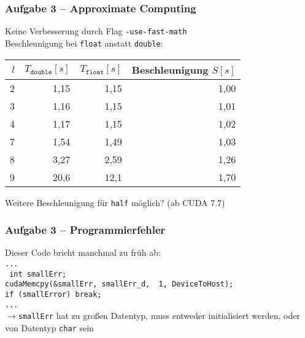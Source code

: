 \documentclass[german,notes,18pt]{beamer}
\begin{document}
	\begin{frame}
		\frametitle{Aufgabe 3 -- Approximate Computing}
		Keine Verbesserung durch Flag \texttt{-use-fast-math} \\
		\vspace{2em}
		Beschleunigung bei \texttt{float} anstatt \texttt{double}:
		\begin{center}
			\begin{tabular}{r|r|r|r}
				$l$ & $T_\mathtt{double}[s]$ & $T_\mathtt{float}[s]$ & Beschleunigung $S[s]$ \\
				\hline
				2 & 1,15 & 1,15 & 1,00 \\
				3 & 1,16 & 1,15 & 1,01 \\
				4 & 1,17 & 1,15 & 1,02 \\
				7 & 1,54 & 1,49 & 1,03 \\
				8 & 3,27 & 2,59 & 1,26 \\
				9 & 20,6 & 12,1 & 1,70
			\end{tabular}
		\end{center}
		\vspace{2em}
		Weitere Beschleunigung für \texttt{half} möglich? (ab CUDA 7.7)
	\end{frame}
	\begin{frame}
		\frametitle{Aufgabe 3 -- Programmierfehler}
		Dieser Code bricht manchmal zu früh ab: \\
		\vspace{1em}
		\texttt{... \\
			{ int} smallErr; \\
			cudaMemcpy(\&smallErr, smallErr\_d, { 1}, DeviceToHost); \\
			if (smallError) break; \\
			...} \\
		\vspace{2em}
		\pause
		$\rightarrow$\texttt{smallErr} hat zu großen Datentyp, muss entweder initialisiert werden, oder von Datentyp \texttt{char} sein
	\end{frame}
\end{document}
